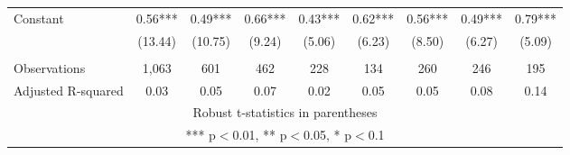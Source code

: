 \documentclass[]{article}
\begin{document}
\begin{tabular}{lcccccccc}
Constant & 0.56*** & 0.49*** & 0.66*** & 0.43*** & 0.62*** & 0.56*** & 0.49*** & 0.79*** \\
 & (13.44) & (10.75) & (9.24) & (5.06) & (6.23) & (8.50) & (6.27) & (5.09) \\
 &  &  &  &  &  &  &  &  \\
Observations & 1,063 & 601 & 462 & 228 & 134 & 260 & 246 & 195 \\
 Adjusted R-squared & 0.03 & 0.05 & 0.07 & 0.02 & 0.05 & 0.05 & 0.08 & 0.14 \\ \hline
\multicolumn{9}{c}{ Robust t-statistics in parentheses} \\
\multicolumn{9}{c}{ *** p$<$0.01, ** p$<$0.05, * p$<$0.1} \\
\end{tabular}
\end{document}
